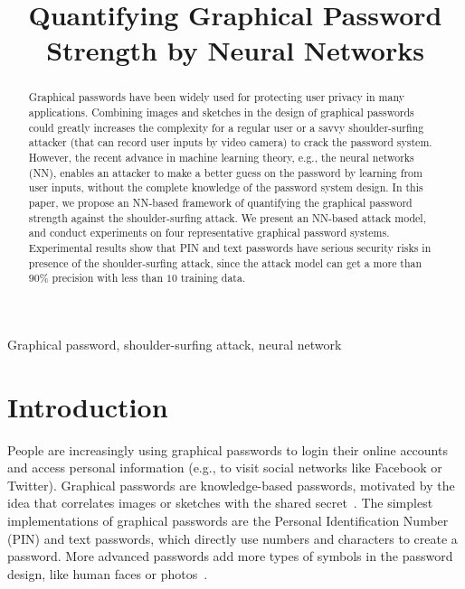 \documentclass{article}
\title{Quantifying Graphical Password Strength by Neural Networks}
\begin{document}
  \maketitle
  \begin{abstract}
  Graphical passwords have been widely used for protecting user privacy in many applications. Combining images and sketches in the design of graphical passwords could greatly increases the complexity for a regular user or a savvy shoulder-surfing attacker (that can record user inputs by video camera) to crack the password system. However, the recent advance in machine learning theory, e.g., the neural networks (NN), enables an attacker to make a better guess on the password by learning from user inputs, without the complete knowledge of the password system design. In this paper, we propose an NN-based framework of quantifying the graphical password strength against the shoulder-surfing attack. We present an NN-based attack model, and conduct experiments on four representative graphical password systems. Experimental results show that PIN and text passwords have serious security risks in presence of the shoulder-surfing attack, since the attack model can get a more than $90\%$ precision with less than $10$ training data.
  \end{abstract}
  \begin{keywords}
  Graphical password, shoulder-surfing attack, neural network
  \end{keywords}
  \section{Introduction}
  \label{sec:intro}

People are increasingly using graphical passwords to login their online accounts and access personal information (e.g., to visit social networks like Facebook or Twitter). Graphical passwords are knowledge-based passwords, motivated by the idea that correlates images or sketches with the shared secret~\cite{DBLP:journals/csur/BiddleCO12}. The simplest implementations of graphical passwords are the Personal Identification Number (PIN) and text passwords, which directly use numbers and characters to create a password. More advanced passwords add more types of symbols in the password design, like human faces or photos~\cite{Passfaces,DBLP:conf/uss/JermynMMRR99,DBLP:conf/soups/WiedenbeckWBBM05}.
\end{document}
